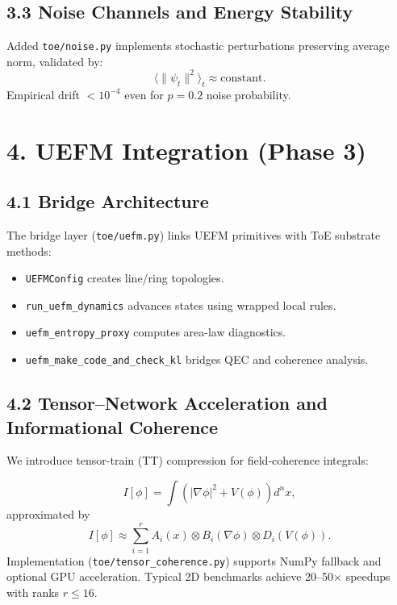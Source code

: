 \documentclass[11pt]{article}
\begin{document}
\subsection*{3.3 Noise Channels and Energy Stability}

Added \texttt{toe/noise.py} implements stochastic perturbations preserving average norm, validated by:
\[
\langle \|\psi_t\|^2 \rangle_t \approx \text{constant}.
\]
Empirical drift \( < 10^{-4} \) even for \( p = 0.2 \) noise probability.

\section{4. UEFM Integration (Phase 3)}

\subsection*{4.1 Bridge Architecture}

The bridge layer (\texttt{toe/uefm.py}) links UEFM primitives with ToE substrate methods:
\begin{itemize}
    \item \texttt{UEFMConfig} creates line/ring topologies.
    \item \texttt{run\_uefm\_dynamics} advances states using wrapped local rules.
    \item \texttt{uefm\_entropy\_proxy} computes area-law diagnostics.
    \item \texttt{uefm\_make\_code\_and\_check\_kl} bridges QEC and coherence analysis.
\end{itemize}

\subsection*{4.2 Tensor–Network Acceleration and Informational Coherence}

We introduce tensor-train (TT) compression for field-coherence integrals:

\[
I[\phi] = \int \left( |\nabla \phi|^2 + V(\phi) \right) d^n x,
\]
approximated by
\[
I[\phi] \approx \sum_{i=1}^{r} A_i(x) \otimes B_i(\nabla \phi) \otimes D_i(V(\phi)).
\]
Implementation (\texttt{toe/tensor\_coherence.py}) supports NumPy fallback and optional GPU acceleration. Typical 2D benchmarks achieve 20–50$\times$ speedups with ranks $r \leq 16$.
\end{document}
